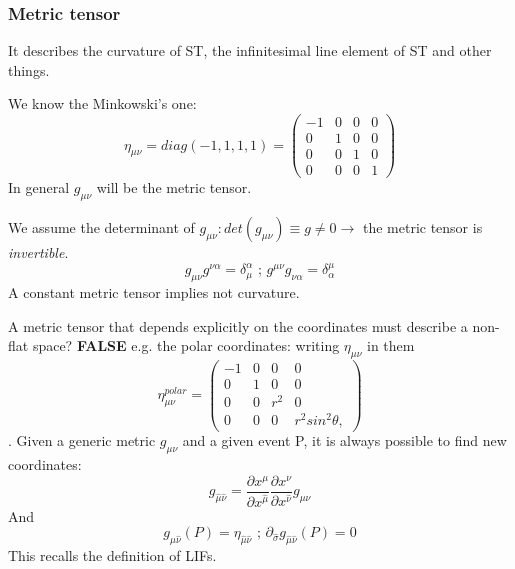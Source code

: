 \subsubsection{Metric tensor}
It describes the curvature of ST, the infinitesimal line element of ST and other things.\par
We know the Minkowski's one:
\begin{equation}
\eta_{\mu \nu } = diag\left( -1,1,1,1 \right) = \begin{pmatrix}
-1 & 0 & 0 & 0 \\
0 & 1 & 0 & 0 \\
0 & 0 & 1 & 0 \\
0 & 0 & 0 & 1
\end{pmatrix} 
\end{equation}
\bigskip
In general $g_{\mu \nu }$ will be the metric tensor.\par
We assume the determinant of $g_{\mu \nu }: det\left( g_{\mu \nu } \right) \equiv g \neq 0 \to $ the metric tensor is \emph{invertible}.
\[
g_{\mu \nu }g^{\nu \alpha } = \delta^{\alpha }_{\mu } \text{ ; } g^{\mu \nu }g_{\nu \alpha } = \delta^{\mu }_{\alpha }
\]
A constant metric tensor implies not curvature.\par
A metric tensor that depends explicitly on the coordinates must describe a non-flat space? \textbf{FALSE} e.g. the polar coordinates: writing $\eta_{\mu \nu }$ in them
\begin{equation}
\eta_{\mu \nu }^{polar} = \begin{pmatrix}
-1 & 0 & 0 & 0 \\
0 & 1 & 0 & 0 \\
0 & 0 & r^{2} & 0 \\
0 & 0 & 0 & r^{2}sin^{2}\theta ,
\end{pmatrix} 
\end{equation}.
Given a generic metric $g_{\mu \nu }$ and a given event P, it is always possible to find new coordinates:
\[
g_{\hat{\mu }\hat{\nu }} = \frac{\partial x^{\mu }}{\partial x^{\hat{\mu }}} \frac{\partial x^{\nu }}{\partial x^{\hat{\nu }}} g_{\mu \nu }
\]
And
\[
g_{\hat{\mu }\hat{\nu }}\left( P \right) = \eta_{\hat{\mu }\hat{\nu }} \text{ ; } \partial_{\hat{\sigma }}g_{\hat{\mu }\hat{\nu }}\left( P \right)=0
\]
This recalls the definition of LIFs.


